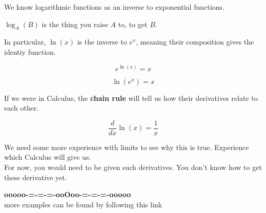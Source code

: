 \documentclass{ximera}
\begin{document}
\begin{idea}


We know logarithmic functions as an inverse to exponential functions. 



\begin{center}


$\log_A(B)$ is the thing you raise $A$ to, to get $B$. \\


\end{center}

In particular, $\ln(x)$ is the inverse to $e^x$, meaning their composition gives the identiy function.



\[
e^{\ln(x)} = x
\]


\[
\ln\left( e^x \right) = x
\]

If we were in Calculus, the \textbf{chain rule} will tell us how their derivatives relate to each other.




\[
\frac{d}{dx} \ln(x) = \frac{1}{x}
\]



\end{idea}


We need some more experience with limits to see why this is true. Experience which Calculus will give us. \\


For now, you would need to be given such derivatives.  You don't know how to get these derivative yet.











\begin{center}
\textbf{\textcolor{green!50!black}{ooooo-=-=-=-ooOoo-=-=-=-ooooo}} \\

more examples can be found by following this link\\ 

\end{center}
\end{document}
